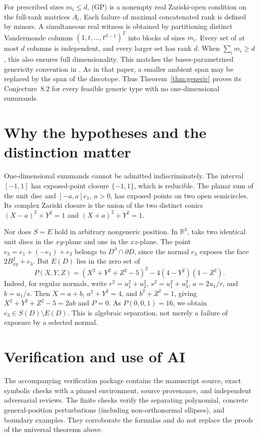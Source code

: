 \documentclass[11pt]{article}
\newcommand{\R}{\mathbb R}
\begin{document}
For prescribed sizes \(m_i\le d\), (GP) is a nonempty real
Zariski-open condition on the full-rank matrices \(A_i\). Each failure
of maximal concatenated rank is defined by minors. A simultaneous real
witness is obtained by partitioning distinct Vandermonde columns
\((1,t,\ldots,t^{d-1})^T\) into blocks of sizes \(m_i\). Every set of
at most \(d\) columns is independent, and every larger set has rank
\(d\). When \(\sum_i m_i\ge d\), this also ensures full dimensionality.
This matches the bases-parametrized genericity convention in
\cite[Section~2]{GM2022}. As in that paper, a smaller ambient span may
be replaced by the span of the discotope. Thus
Theorem~\ref{thm:generic} proves its Conjecture~8.2 for every feasible
generic type with no one-dimensional summands.

\section{Why the hypotheses and the distinction matter}\label{sec:limits}

One-dimensional summands cannot be admitted indiscriminately.
The interval \([-1,1]\) has exposed-point closure \(\{-1,1\}\), which
is reducible. The planar sum of the unit disc and \([-a,a]e_1\),
\(a>0\), has exposed points on two open semicircles. Its complex
Zariski closure is the union of the two distinct conics
\((X-a)^2+Y^2=1\) and \((X+a)^2+Y^2=1\).

Nor does \(S=E\) hold in arbitrary nongeneric position. In \(\R^3\),
take two identical unit discs in the \(xy\)-plane and one in the
\(xz\)-plane. The point \(e_3=e_1+(-e_1)+e_3\) belongs to
\(D^\partial\cap\partial D\), since the normal \(e_3\) exposes the
face \(2B^2_{xy}+e_3\). But \(E(D)\) lies in the zero set of
\[
 P(X,Y,Z)=(X^2+Y^2+Z^2-5)^2-4(4-Y^2)(1-Z^2).
\]
Indeed, for regular normals, write \(r^2=u_1^2+u_2^2\),
\(s^2=u_1^2+u_3^2\), \(a=2u_1/r\), and \(b=u_1/s\).
Then \(X=a+b\), \(a^2+Y^2=4\), and \(b^2+Z^2=1\), giving
\(X^2+Y^2+Z^2-5=2ab\) and \(P=0\). As \(P(0,0,1)=16\), we obtain
\(e_3\in S(D)\setminus E(D)\). This is algebraic separation, not
merely a failure of exposure by a selected normal.

\section*{Verification and use of AI}

The accompanying verification package contains the manuscript source,
exact symbolic checks with a pinned environment, source provenance,
and independent adversarial reviews. The finite checks verify the
separating polynomial, concrete general-position perturbations
(including non-orthonormal ellipses), and boundary examples. They
corroborate the formulas and do not replace the proofs of the universal
theorems above.
\end{document}
